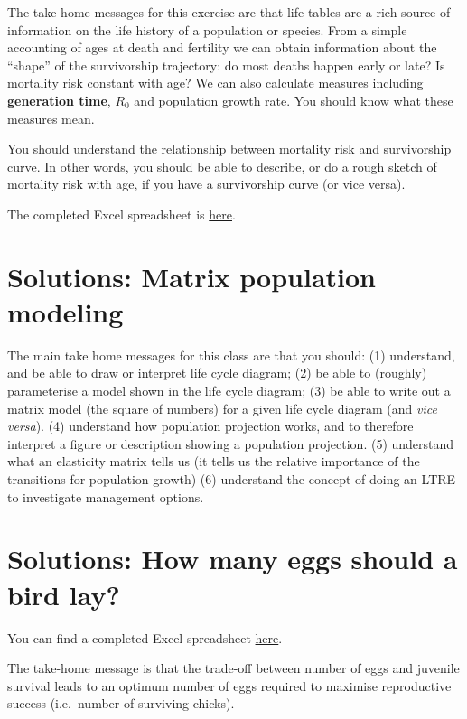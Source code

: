\documentclass[
  a4paper]{book}
\begin{document}
The take home messages for this exercise are that life tables are a rich source of information on the life history of a population or species. From a simple accounting of ages at death and fertility we can obtain information about the ``shape'' of the survivorship trajectory: do most deaths happen early or late? Is mortality risk constant with age? We can also calculate measures including \textbf{generation time}, \(R_0\) and population growth rate. You should know what these measures mean.

You should understand the relationship between mortality risk and survivorship curve. In other words, you should be able to describe, or do a rough sketch of mortality risk with age, if you have a survivorship curve (or vice versa).

The completed Excel spreadsheet is \href{https://www.dropbox.com/s/j8uv2wf7nz0ygmp/Life\%20tables\%20exercise\%20-\%20complete.xlsx?dl=1}{here}.

\section{Solutions: Matrix population modeling}\label{solutions-matrix-population-modeling}

The main take home messages for this class are that you should:
(1) understand, and be able to draw or interpret life cycle diagram;
(2) be able to (roughly) parameterise a model shown in the life cycle diagram;
(3) be able to write out a matrix model (the square of numbers) for a given life cycle diagram (and \emph{vice versa}).
(4) understand how population projection works, and to therefore interpret a figure or description showing a population projection.
(5) understand what an elasticity matrix tells us (it tells us the relative importance of the transitions for population growth)
(6) understand the concept of doing an LTRE to investigate management options.

\section{Solutions: How many eggs should a bird lay?}\label{solutions-how-many-eggs-should-a-bird-lay}

You can find a completed Excel spreadsheet \href{https://www.dropbox.com/s/tcpxmdfvm35jzgr/How\%20many\%20eggs\%20-\%20answers.xlsx?dl=1}{here}.

The take-home message is that the trade-off between number of eggs and juvenile survival leads to an optimum number of eggs required to maximise reproductive success (i.e.~number of surviving chicks).
\end{document}
